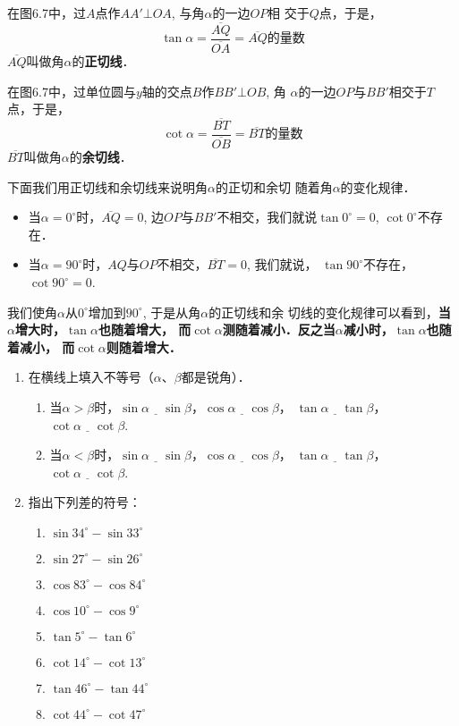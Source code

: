 在图6.7中，过$A$点作$AA'\bot OA$, 与角$\alpha$的一边$OP$相
交于$Q$点，于是，
\[\tan\alpha=\frac{\overline{AQ}}{\overline{OA}}=\overline{AQ}\text{的量数}\]
$\overline{AQ}$叫做角$\alpha$的\textbf{正切线}．

在图6.7中，过单位圆与$y$轴的交点$B$作$BB'\bot OB$, 角
$\alpha$的一边$OP$与$BB'$相交于$T$点，于是，
\[\cot\alpha=\frac{\overline{BT}}{\overline{OB}}=\overline{BT}\text{的量数}\]
$\overline{BT}$叫做角$\alpha$的\textbf{余切线}．

下面我们用正切线和余切线来说明角$\alpha$的正切和余切
随着角$\alpha$的变化规律．

\begin{itemize}
    \item 当$\alpha =0^{\circ}$时，$\overline{AQ}=0$, 边$OP$与$BB'$不相交，我们就说$\tan0^{\circ}=0$,
    $\cot 0^{\circ}$不存在．
    \item 当$\alpha =90^{\circ}$时，$AQ$与$OP$不相交，$\overline{BT}=0$, 
    我们就说，
    $\tan90^{\circ}$不存在，
    $\cot 90^{\circ}=0$.
\end{itemize}

我们使角$\alpha$从$0^{\circ}$增加到$90^{\circ}$, 于是从角$\alpha$的正切线和余
切线的变化规律可以看到，\textbf{当$\alpha$增大时，$\tan\alpha$也随着增大，
而$\cot\alpha$测随着减小．反之当$\alpha$减小时，$\tan\alpha$也随着减小，
而$\cot\alpha$则随着增大．}


\begin{ex}
\begin{enumerate}
    \item 在横线上填入不等号（$\alpha$、$\beta$都是锐角）．
    \begin{enumerate}
    \item 当$\alpha>\beta$时，$\sin\alpha\underline{\quad}\sin\beta$，$\cos\alpha\underline{\quad}\cos\beta$，
    $\tan\alpha\underline{\quad}\tan\beta$，$\cot\alpha\underline{\quad}\cot\beta$.
    \item 当$\alpha<\beta$时，$\sin\alpha\underline{\quad}\sin\beta$，$\cos\alpha\underline{\quad}\cos\beta$，
    $\tan\alpha\underline{\quad}\tan\beta$，$\cot\alpha\underline{\quad}\cot\beta$.
    \end{enumerate}

    \item 指出下列差的符号：
\begin{multicols}{2}
\begin{enumerate}
    \item $\sin34^{\circ}-\sin33^{\circ}$
    \item $ \sin27^{\circ}-\sin26^{\circ}$
    \item $\cos83^{\circ}-\cos84^{\circ}$
    \item $\cos10^{\circ}-\cos9^{\circ}$
    \item $\tan 5^{\circ}-\tan 6^{\circ}$
    \item $\cot 14^{\circ}-\cot 13^{\circ}$
    \item $\tan 46^{\circ}-\tan 44^{\circ}$
    \item $\cot 44^{\circ}-\cot 47^{\circ}$
\end{enumerate}
\end{multicols}
\end{enumerate}
\end{ex}

